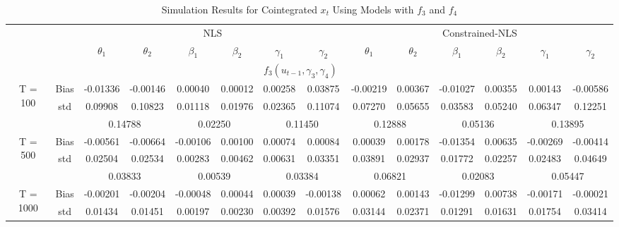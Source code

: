 \documentclass[a4paper,12pt,times,numbered,print,index]{report}
\numberwithin{equation}{section}
\begin{document}
\begin{table}[htbp]
  \centering
  \caption{Simulation Results for Cointegrated $x_t$ Using Models with $f_3$ and $f_4$}
    \begin{adjustbox}{max width=\textwidth}
    \begin{tabular}{cccccccccccccc}
    \toprule
          &       & \multicolumn{6}{c}{NLS}                       & \multicolumn{6}{c}{Constrained-NLS} \\
          &       & $\theta_1$ & $\theta_2$ & $\beta_1$ & $\beta_2$ & $\gamma_1$ & $\gamma_2$ & $\theta_1$ & $\theta_2$ & $\beta_1$ & $\beta_2$ & $\gamma_1$ & $\gamma_2$ \\
    \midrule
    &       & \multicolumn{10}{c}{$f_3 (u_{t-1}, \gamma_3, \gamma_4)$}                \\
    \midrule
    \multirow{3}[1]{*}{T = 100} & Bias  & \textcolor[rgb]{ 0,  .439,  .753}{-0.01336} & -0.00146 & 0.00040 & 0.00012 & 0.00258 & 0.03875 & \textcolor[rgb]{ 0,  .439,  .753}{-0.00219} & 0.00367 & -0.01027 & 0.00355 & 0.00143 & -0.00586 \\
          & std   & 0.09908 & 0.10823 & 0.01118 & 0.01976 & 0.02365 & 0.11074 & 0.07270 & 0.05655 & 0.03583 & 0.05240 & 0.06347 & 0.12251 \\
          &       & \multicolumn{2}{c}{0.14788} & \multicolumn{2}{c}{0.02250} & \multicolumn{2}{c}{0.11450} & \multicolumn{2}{c}{0.12888} & \multicolumn{2}{c}{0.05136} & \multicolumn{2}{c}{0.13895} \\
    \multirow{3}[0]{*}{T = 500} & Bias  & \textcolor[rgb]{ 0,  .439,  .753}{-0.00561} & -0.00664 & -0.00106 & 0.00100 & 0.00074 & 0.00084 & \textcolor[rgb]{ 0,  .439,  .753}{0.00039} & 0.00178 & -0.01354 & 0.00635 & -0.00269 & -0.00414 \\
          & std   & 0.02504 & 0.02534 & 0.00283 & 0.00462 & 0.00631 & 0.03351 & 0.03891 & 0.02937 & 0.01772 & 0.02257 & 0.02483 & 0.04649 \\
          &       & \multicolumn{2}{c}{0.03833} & \multicolumn{2}{c}{0.00539} & \multicolumn{2}{c}{0.03384} & \multicolumn{2}{c}{0.06821} & \multicolumn{2}{c}{0.02083} & \multicolumn{2}{c}{0.05447} \\
    \multirow{3}[1]{*}{T = 1000} & Bias  & \textcolor[rgb]{ 0,  .439,  .753}{-0.00201} & -0.00204 & -0.00048 & 0.00044 & 0.00039 & -0.00138 & \textcolor[rgb]{ 0,  .439,  .753}{0.00062} & 0.00143 & -0.01299 & 0.00738 & -0.00171 & -0.00021 \\
          & std   & 0.01434 & 0.01451 & 0.00197 & 0.00230 & 0.00392 & 0.01576 & 0.03144 & 0.02371 & 0.01291 & 0.01631 & 0.01754 & 0.03414 \\

\end{tabular}
\end{adjustbox}
\end{table}
\end{document}
